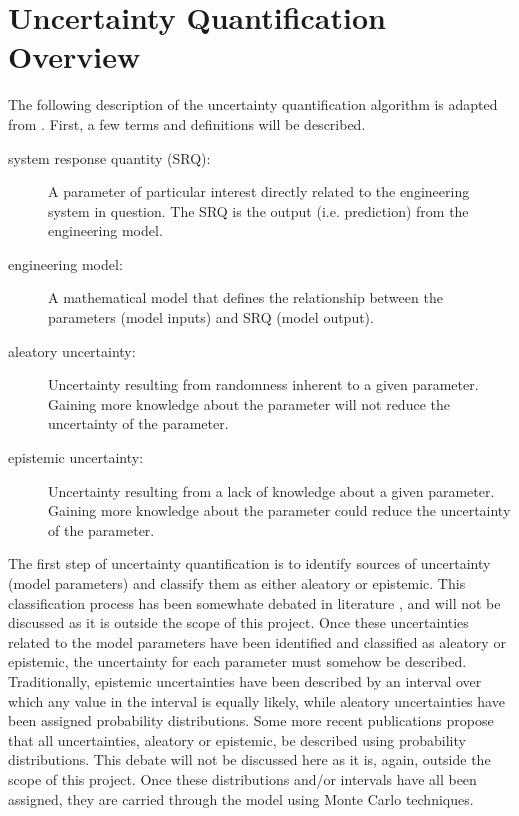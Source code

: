 \documentclass[11pt]{asaproc}\usepackage[]{graphicx}\usepackage[]{color}
\begin{document}
\section{Uncertainty Quantification Overview}  
\label{UQOverview}

The following description of the uncertainty quantification algorithm is adapted from \cite{EW2018}. First, a few terms and definitions will be described. 

\begin{description}
\item[system response quantity (SRQ):] A parameter of particular interest directly related to the engineering system in question. The SRQ is the output (i.e. prediction) from the engineering model.
\item[engineering model:] A mathematical model that defines the relationship between the parameters (model inputs) and SRQ (model output). 
\item[aleatory uncertainty:] Uncertainty resulting from randomness inherent to a given parameter. Gaining more knowledge about the parameter will not reduce the uncertainty of the parameter. 
\item[epistemic uncertainty:] Uncertainty resulting from a lack of knowledge about a given parameter. Gaining more knowledge about the parameter could reduce the uncertainty of the parameter. 
\end{description}

The first step of uncertainty quantification is to identify sources of uncertainty (model parameters) and classify them as either aleatory or epistemic. This classification process has been somewhate debated in literature \citep{KD2009}, and will not be discussed as it is outside the scope of this project. Once these uncertainties related to the model parameters have been identified and classified as aleatory or epistemic, the uncertainty for each parameter must somehow be described. Traditionally, epistemic uncertainties have been described by an interval over which any value in the interval is equally likely, while aleatory uncertainties have been assigned probability distributions. Some more recent publications \citep{EW2018} propose that all uncertainties, aleatory or epistemic, be described using probability distributions. This debate will not be discussed here as it is, again, outside the scope of this project. Once these distributions and/or intervals have all been assigned, they are carried through the model using Monte Carlo techniques.
\end{document}
